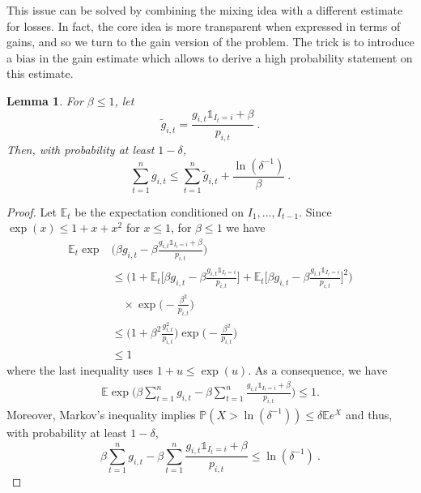 \documentclass[11pt]{hackednow}
\newtheorem{lemma}{Lemma}[chapter]
\renewcommand{\P}{\mathbb{P}}
\newcommand{\E}{\mathbb{E}}
\def\ds1{\mathds{1}}
\renewcommand{\tilde}{\widetilde}
\begin{document}
This issue can be solved by combining the mixing idea with a different estimate for losses. In fact, the core idea is more transparent when expressed in terms of gains, and so we turn to the gain version of the problem. The trick is to introduce a bias in the gain estimate which allows to derive a high probability statement on this estimate.
%
\begin{lemma} \label{lem:exp3P}
For $\beta \le 1$, let
\[
    \tilde{g}_{i,t} = \frac{g_{i,t} \ds1_{I_t=i} + \beta}{p_{i,t}}~.
\]
Then, with probability at least $1-\delta$,
$$\sum_{t=1}^n g_{i,t} \leq \sum_{t=1}^n \tilde{g}_{i,t}  + \frac{\ln(\delta^{-1})}{\beta}~.$$
\end{lemma}
%
\begin{proof}
Let $\E_t$ be the expectation conditioned on $I_1,\dots,I_{t-1}$. Since $\exp(x)\le 1+x+x^2$ for $x\leq 1$, for $\beta\leq 1$ we have
\begin{align*}
    \E_t \exp&\bigg(\beta g_{i,t} - \beta \frac{g_{i,t} \ds1_{I_t=i} + \beta}{p_{i,t}}\bigg)
\\ &\leq
    \Bigg(1 + \E_t \bigg[\beta g_{i,t} - \beta \frac{g_{i,t} \ds1_{I_t=i}}{p_{i,t}}\bigg] + \E_t \bigg[\beta g_{i,t} - \beta \frac{g_{i,t} \ds1_{I_t=i}}{p_{i,t}}\bigg]^2 \Bigg)
\\ &\quad
    \times\exp\bigg(\!- \frac{\beta^2}{p_{i,t}}\bigg)
\\ &\leq
    \Bigg(1 + \beta^2 \frac{g^2_{i,t}}{p_{i,t}} \Bigg) \exp\bigg(\!- \frac{\beta^2}{p_{i,t}}\bigg)
\\ &\leq
     1
\end{align*}
where the last inequality uses $1+u \leq \exp(u)$. As a consequence, we have
  \begin{align*}
  \E \exp\bigg(\beta \sum_{t=1}^n g_{i,t} - \beta \sum_{t=1}^n \frac{g_{i,t} \ds1_{I_t=i} + \beta}{p_{i,t}}\bigg) \leq 1.
  \end{align*}
Moreover, Markov's inequality implies $\P\left(X>\ln(\delta^{-1})\right) \leq \delta \E e^X$ and thus, with probability at least $1-\delta$,
$$\beta \sum_{t=1}^n g_{i,t} - \beta \sum_{t=1}^n \frac{g_{i,t} \ds1_{I_t=i} + \beta}{p_{i,t}} \leq \ln(\delta^{-1})~.$$
\end{proof}
%
\end{document}
